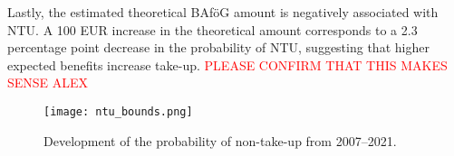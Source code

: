Lastly, the estimated theoretical BAföG amount is negatively associated with NTU. A 100 EUR increase in the theoretical amount corresponds to a 2.3 percentage point decrease in the probability of NTU, suggesting that higher expected benefits increase take-up. \textcolor{red}{PLEASE CONFIRM THAT THIS MAKES SENSE ALEX}

\begin{figure}[htbp]
  \centering
  \texttt{[image: ntu\_bounds.png]}
  \caption{Development of the probability of non-take-up from 2007--2021.}
  \label{fig:ntu_bounds_over_years}
\end{figure}

